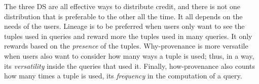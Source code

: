 The three DS are all effective ways to distribute credit, and there is not one distribution that is preferable to the other all the time. It all depends on the needs of the users. 
Lineage is to be preferred when users only want to see the tuples used in queries and reward more the tuples used in many queries. It only rewards based on the \emph{presence} of the tuples. 
Why-provenance is more versatile when users also want to consider how many ways a tuple is used; thus, in a way, its \emph{versatility} inside the queries that used it.
Finally, how-provenance also counts how many times a tuple is used, its \emph{frequency} in the computation of a query. 